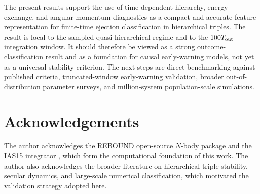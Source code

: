 \documentclass[12pt,a4paper]{article}
\newcommand{\Tout}{T_{\rm out}}
\begin{document}
The present results support the use of time-dependent hierarchy, energy-exchange, and angular-momentum diagnostics as a compact and accurate feature representation for finite-time ejection classification in hierarchical triples. The result is local to the sampled quasi-hierarchical regime and to the \(100\Tout\) integration window. It should therefore be viewed as a strong outcome-classification result and as a foundation for causal early-warning models, not yet as a universal stability criterion. The next steps are direct benchmarking against published criteria, truncated-window early-warning validation, broader out-of-distribution parameter surveys, and million-system population-scale simulations.

\section*{Acknowledgements}

The author acknowledges the REBOUND open-source \(N\)-body package \citep{Rein2012} and the IAS15 integrator \citep{Rein2015}, which form the computational foundation of this work. The author also acknowledges the broader literature on hierarchical triple stability, secular dynamics, and large-scale numerical classification, which motivated the validation strategy adopted here.



\end{document}
